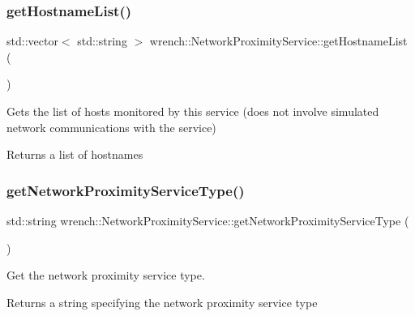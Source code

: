 \subsubsection{\texorpdfstring{get\+Hostname\+List()}{getHostnameList()}}
{\footnotesize\ttfamily std\+::vector$<$ std\+::string $>$ wrench\+::\+Network\+Proximity\+Service\+::get\+Hostname\+List (\begin{DoxyParamCaption}{ }\end{DoxyParamCaption})}



Gets the list of hosts monitored by this service (does not involve simulated network communications with the service) 

\begin{DoxyReturn}{Returns}
a list of hostnames 
\end{DoxyReturn}
\mbox{\label{classwrench_1_1_network_proximity_service_a3a70bf6b279c431f5f9cffc4207822af}} 
\subsubsection{\texorpdfstring{get\+Network\+Proximity\+Service\+Type()}{getNetworkProximityServiceType()}}
{\footnotesize\ttfamily std\+::string wrench\+::\+Network\+Proximity\+Service\+::get\+Network\+Proximity\+Service\+Type (\begin{DoxyParamCaption}{ }\end{DoxyParamCaption})}



Get the network proximity service type. 

\begin{DoxyReturn}{Returns}
a string specifying the network proximity service type 
\end{DoxyReturn}
\mbox{\label{classwrench_1_1_network_proximity_service_a3fe7aa39935af1eeeccdd18288f88068}} 
